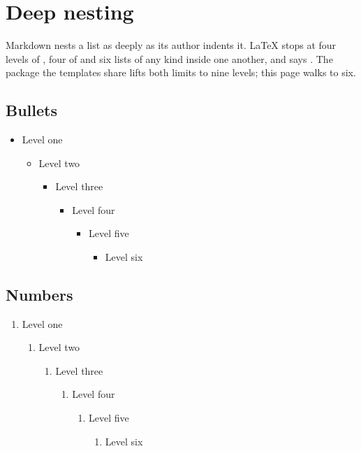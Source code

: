 \documentclass[twoside]{memoir}
\title{\Huge\bfseries\booktitle}
\author{\bookauthor}
\begin{document}
\hypersetup{pageanchor=false}
\frontmatter
\maketitle
\thispagestyle{empty}
\thispagestyle{empty}
\raggedbottom
\clearpage
\tableofcontents*
\hypersetup{pageanchor=true}
\mainmatter
\chapter{Deep nesting}
Markdown nests a list as deeply as its author indents it. \LaTeX{} stops at four
levels of , four of  and six lists of any kind inside one
another, and says . The  package the
templates share lifts both limits to nine levels; this page walks to six.
\section{Bullets}
\begin{itemize}
\item Level one
\begin{itemize}
\item Level two
\begin{itemize}
\item Level three
\begin{itemize}
\item Level four
\begin{itemize}
\item Level five
\begin{itemize}
\item Level six
\end{itemize}
\end{itemize}
\end{itemize}
\end{itemize}
\end{itemize}
\end{itemize}
\section{Numbers}
\begin{enumerate}
\item Level one
\begin{enumerate}
\item Level two
\begin{enumerate}
\item Level three
\begin{enumerate}
\item Level four
\begin{enumerate}
\item Level five
\begin{enumerate}
\item Level six
\end{enumerate}
\end{enumerate}
\end{enumerate}
\end{enumerate}
\end{enumerate}
\end{enumerate}
\end{document}
